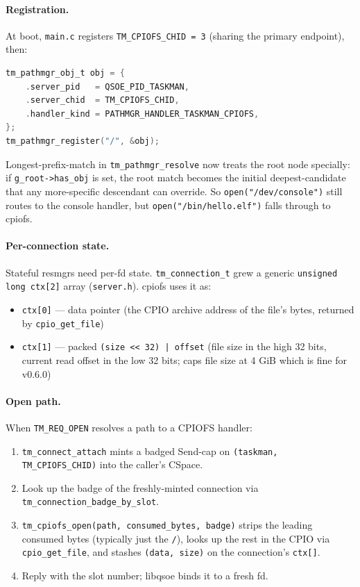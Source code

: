 \paragraph{Registration.}  At boot, \texttt{main.c} registers
\texttt{TM\_CPIOFS\_CHID = 3} (sharing the primary endpoint), then:
\begin{lstlisting}[language=C]
tm_pathmgr_obj_t obj = {
    .server_pid   = QSOE_PID_TASKMAN,
    .server_chid  = TM_CPIOFS_CHID,
    .handler_kind = PATHMGR_HANDLER_TASKMAN_CPIOFS,
};
tm_pathmgr_register("/", &obj);
\end{lstlisting}

Longest-prefix-match in \texttt{tm\_pathmgr\_resolve} now treats
the root node specially: if \texttt{g\_root->has\_obj} is set,
the root match becomes the initial deepest-candidate that any
more-specific descendant can override.  So
\texttt{open("/dev/console")} still routes to the console
handler, but \texttt{open("/bin/hello.elf")} falls through to
cpiofs.

\paragraph{Per-connection state.}  Stateful resmgrs need
per-fd state.  \texttt{tm\_connection\_t} grew a generic
\texttt{unsigned long ctx[2]} array (\texttt{server.h}).  cpiofs
uses it as:
\begin{itemize}
    \item \texttt{ctx[0]} --- data pointer (the CPIO archive
          address of the file's bytes, returned by
          \texttt{cpio\_get\_file})
    \item \texttt{ctx[1]} --- packed \texttt{(size << 32) | offset}
          (file size in the high 32 bits, current read offset in
          the low 32 bits; caps file size at 4 GiB which is fine
          for v0.6.0)
\end{itemize}

\paragraph{Open path.}  When \texttt{TM\_REQ\_OPEN} resolves a
path to a CPIOFS handler:
\begin{enumerate}
    \item \texttt{tm\_connect\_attach} mints a badged Send-cap on
          \texttt{(taskman, TM\_CPIOFS\_CHID)} into the caller's
          CSpace.
    \item Look up the badge of the freshly-minted connection via
          \texttt{tm\_connection\_badge\_by\_slot}.
    \item \texttt{tm\_cpiofs\_open(path, consumed\_bytes, badge)}
          strips the leading consumed bytes (typically just the
          \texttt{/}), looks up the rest in the CPIO via
          \texttt{cpio\_get\_file}, and stashes \texttt{(data,
          size)} on the connection's \texttt{ctx[]}.
    \item Reply with the slot number; libqsoe binds it to a
          fresh fd.
\end{enumerate}

